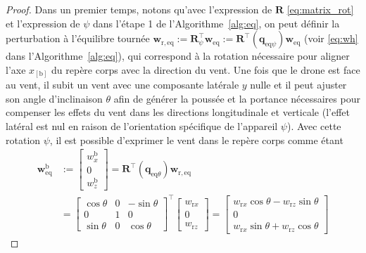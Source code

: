     \begin{proof}
        Dans un premier temps, notons qu'avec l'expression de $\boldsymbol{R}$ \eqref{eq:matrix_rot} et l'expression de  $\psi$ dans l'étape 1 de l'Algorithme~\ref{alg:eq}, on peut définir la perturbation à l'équilibre tournée $\boldsymbol{w}_{\mathrm{r,eq}} := \boldsymbol{R}^\top_{\psi} \boldsymbol{w}_{\mathrm{eq}} :=    \boldsymbol{R}^\top(\boldsymbol{q}_{\mathrm{eq}\psi})\boldsymbol{w}_{\mathrm{eq}}$ (voir \eqref{eq:wh} dans l'Algorithme~\ref{alg:eq}),
        qui correspond à la rotation nécessaire pour aligner l'axe  $x_{[\text{b}]}$ du repère corps avec la direction du vent. Une fois que le drone est face au vent, il subit un vent avec une composante latérale $y$ nulle et il peut ajuster son angle d'inclinaison $\theta$ afin de générer la poussée et la portance nécessaires pour compenser les effets du vent dans les directions longitudinale et verticale (l'effet latéral est nul en raison de l'orientation spécifique de l'appareil $\psi$). Avec cette rotation $\psi$, il est possible d'exprimer le vent dans le repère corps comme étant
            \begin{align}
            \label{eq:wb}
                \boldsymbol{w}^{\text{b}}_{\mathrm{eq}} &:= 
                \begin{bmatrix}
                    w_{x}^{\text{b}} \\ 0 \\ w_{z}^{\text{b}}
                \end{bmatrix} \!=\! 
                \boldsymbol{R}^\top(\boldsymbol{q}_{\text{eq}\theta}) \boldsymbol{w}_{\mathrm{r,eq}}  \\
                &=\!\! \begin{bmatrix}
                    \cos{\theta} & 0 & -\sin{\theta}\\
                        0 & 1 & 0\\
                    \sin{\theta} & 0 & \cos{\theta}
                \end{bmatrix}^\top \!\! \begin{bmatrix}
                    w_{\text{r}x}\\
                    0\\
                    w_{\text{r}z}
                \end{bmatrix}
                \!\!=\!\!\begin{bmatrix}
                    w_{\text{r}x} \cos{\theta} - w_{\text{r}z} \sin{\theta}\\
                    0\\
                    w_{\text{r}x} \sin{\theta} +  w_{\text{r}z} \cos{\theta}
                \end{bmatrix}
            \nonumber
            \end{align}


\end{proof}

